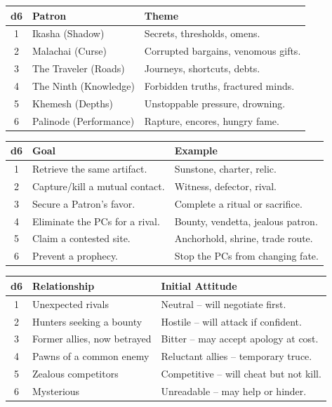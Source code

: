 \begin{tcolorbox}[title=Patron (roll once per character or once for the party), colback=white!97!gray, colframe=black!80!gray,breakable]
\centering
\begin{tabular}{cll}
\toprule
\textbf{d6} & \textbf{Patron} & \textbf{Theme} \\
\midrule
1 & Ikasha (Shadow) & Secrets, thresholds, omens. \\
2 & Malachai (Curse) & Corrupted bargains, venomous gifts. \\
3 & The Traveler (Roads) & Journeys, shortcuts, debts. \\
4 & The Ninth (Knowledge) & Forbidden truths, fractured minds. \\
5 & Khemesh (Depths) & Unstoppable pressure, drowning. \\
6 & Palinode (Performance) & Rapture, encores, hungry fame. \\
\bottomrule
\end{tabular}
\end{tcolorbox}

\begin{tcolorbox}[title=Goal (pressure or obstacle), colback=white!97!gray, colframe=black!80!gray,breakable]
\centering
\begin{tabular}{cll}
\toprule
\textbf{d6} & \textbf{Goal} & \textbf{Example} \\
\midrule
1 & Retrieve the same artifact. & Sunstone, charter, relic. \\
2 & Capture/kill a mutual contact. & Witness, defector, rival. \\
3 & Secure a Patron's favor. & Complete a ritual or sacrifice. \\
4 & Eliminate the PCs for a rival. & Bounty, vendetta, jealous patron. \\
5 & Claim a contested site. & Anchorhold, shrine, trade route. \\
6 & Prevent a prophecy. & Stop the PCs from changing fate. \\
\bottomrule
\end{tabular}
\end{tcolorbox}

\begin{tcolorbox}[title=Relationship to PCs, colback=white!97!gray, colframe=black!80!gray,breakable]
\centering
\begin{tabular}{cll}
\toprule
\textbf{d6} & \textbf{Relationship} & \textbf{Initial Attitude} \\
\midrule
1 & Unexpected rivals & Neutral -- will negotiate first. \\
2 & Hunters seeking a bounty & Hostile -- will attack if confident. \\
3 & Former allies, now betrayed & Bitter -- may accept apology at cost. \\
4 & Pawns of a common enemy & Reluctant allies -- temporary truce. \\
5 & Zealous competitors & Competitive -- will cheat but not kill. \\
6 & Mysterious & Unreadable -- may help or hinder. \\
\bottomrule
\end{tabular}
\end{tcolorbox}

